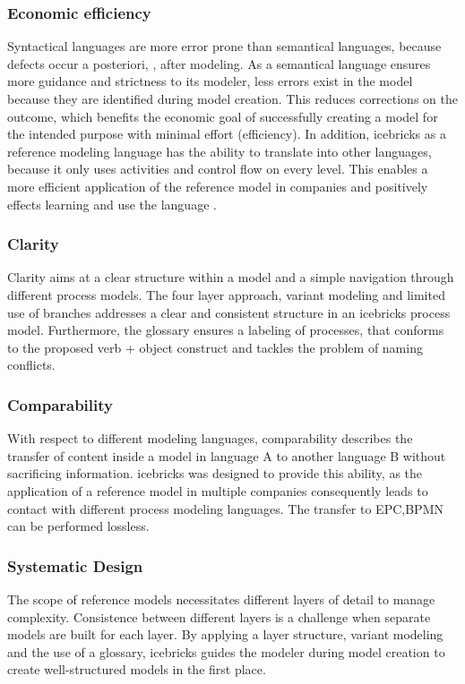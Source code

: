 	  \subsubsection{Economic efficiency}
	 Syntactical languages are more error prone than semantical languages, because defects occur a posteriori, \ie, after modeling. As a semantical language ensures more guidance and strictness to its modeler, less errors exist in the model because they are identified during model creation. This reduces corrections on the outcome, which benefits the economic goal of successfully creating a model for the intended purpose with minimal effort (efficiency). In addition, icebricks as a reference modeling language has the ability to translate into other languages, because it only uses activities and control flow on every level. This enables a more efficient application of the reference model in companies and positively effects learning and use the language \citep{Muehlen}. 
	 
	 \subsubsection{Clarity}
	 Clarity aims at a clear structure within a model and a simple navigation through different process models. The four layer approach, variant modeling and limited use of branches addresses a clear and consistent structure in an icebricks process model. Furthermore, the glossary ensures a labeling of processes, that conforms to the proposed verb + object construct \citep{7pmg} and tackles the problem of naming conflicts.
	 
	 \subsubsection{Comparability} 
	 With respect to different modeling languages, comparability describes the transfer of content inside a model in language A to another language B without sacrificing information. icebricks was designed to provide this ability, as the application of a reference model in multiple companies consequently leads to contact with different process modeling languages. The transfer to \acrshort{EPC},\acrshort{BPMN} can be performed lossless. 
	 
	 \subsubsection{Systematic Design}
	 The scope of reference models necessitates different layers of detail to manage complexity. Consistence between different layers is a challenge when separate models are built for each layer. By applying a layer structure, variant modeling and the use of a glossary, icebricks guides the modeler during model creation to create well-structured models in the first place. 

	
